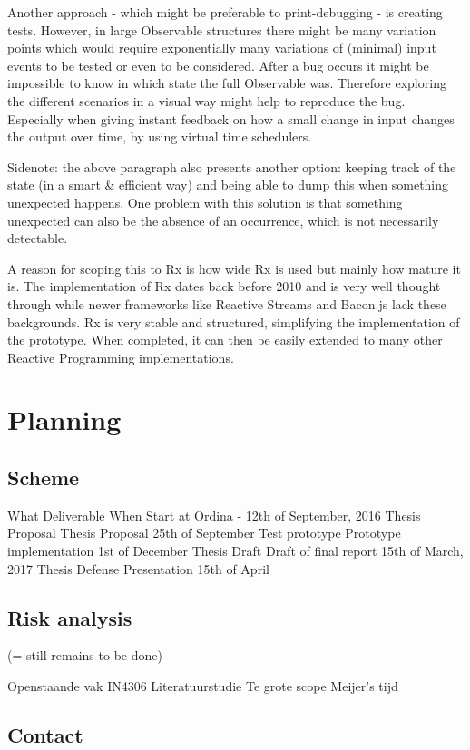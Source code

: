 \documentclass[11pt,a4paper]{article}
\begin{document}
Another approach - which might be preferable to print-debugging - is creating tests. However, in large Observable structures there might be many variation points which would require exponentially many variations of (minimal) input events to be tested or even to be considered. After a bug occurs it might be impossible to know in which state the full Observable was. Therefore exploring the different scenarios in a visual way might help to reproduce the bug. Especially when giving instant feedback on how a small change in input changes the output over time, by using virtual time schedulers. 

Sidenote: the above paragraph also presents another option: keeping track of the state (in a smart \& efficient way) and being able to dump this when something unexpected happens. One problem with this solution is that something unexpected can also be the absence of an occurrence, which is not necessarily detectable.

A reason for scoping this to Rx is how wide Rx is used but mainly how mature it is. The implementation of Rx dates back before 2010 and is very well thought through while newer frameworks like Reactive Streams and Bacon.js lack these backgrounds. Rx is very stable and structured, simplifying the implementation of the prototype. When completed, it can then be easily extended to many other Reactive Programming implementations.

\section{Planning}

\subsection{Scheme}

What
Deliverable
When
Start at Ordina
-
12th of September, 2016
Thesis Proposal
Thesis Proposal
25th of September
Test prototype
Prototype implementation
1st of December
Thesis Draft
Draft of final report
15th of March, 2017
Thesis Defense
Presentation
15th of April

\subsection{Risk analysis}
(= still remains to be done)

Openstaande vak IN4306 Literatuurstudie
Te grote scope
Meijer's tijd

\subsection{Contact}
\end{document}
